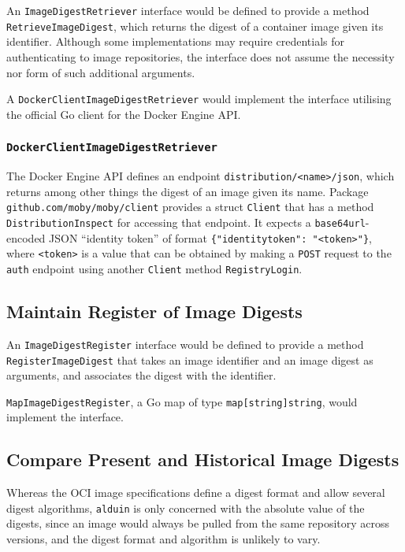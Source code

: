 \documentclass{article}
\begin{document}
An \texttt{ImageDigestRetriever} interface would be defined
to provide a method \texttt{RetrieveImageDigest},
which returns the digest of a container image given its identifier.
Although some implementations may require credentials
for authenticating to image repositories,
the interface does not assume
the necessity nor form of such additional arguments.

A \texttt{DockerClientImageDigestRetriever} would implement the interface
utilising the official Go client for the Docker Engine API.

\subsubsection{\texttt{DockerClientImageDigestRetriever}}
The Docker Engine API defines an endpoint \texttt{distribution/<name>/json},
which returns among other things the digest of an image given its name.
Package \texttt{github.com/moby/moby/client} provides a struct \texttt{Client}
that has a method \texttt{DistributionInspect} for accessing that endpoint.
It expects a \texttt{base64url}-encoded JSON ``identity token''
of format \texttt{\{"identitytoken": "<token>"\}},
where \texttt{<token>} is a value that can be obtained
by making a \texttt{POST} request to the \texttt{auth} endpoint
using another \texttt{Client} method \texttt{RegistryLogin}.

\subsection{Maintain Register of Image Digests}
An \texttt{ImageDigestRegister} interface would be defined
to provide a method \texttt{RegisterImageDigest}
that takes an image identifier and an image digest as arguments, and
associates the digest with the identifier.

\texttt{MapImageDigestRegister}, a Go map of type \texttt{map[string]string},
would implement the interface.

\subsection{Compare Present and Historical Image Digests}
Whereas the OCI image specifications define a digest format and
allow several digest algorithms,
\texttt{alduin} is only concerned with the absolute value of the digests,
since an image would always be pulled from the same repository
across versions, and
the digest format and algorithm is unlikely to vary.
\end{document}

